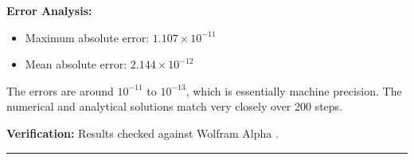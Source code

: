 \textbf{Error Analysis:}
\begin{itemize}
    \item Maximum absolute error: $1.107 \times 10^{-11}$
    \item Mean absolute error: $2.144 \times 10^{-12}$
\end{itemize}

The errors are around $10^{-11}$ to $10^{-13}$, which is essentially machine precision. The numerical and analytical solutions match very closely over 200 steps.

\textbf{Verification:} Results checked against Wolfram Alpha \cite{wolframalpha_rk4_verification}.

\vspace{2em}
\noindent\rule{\textwidth}{0.4pt}
